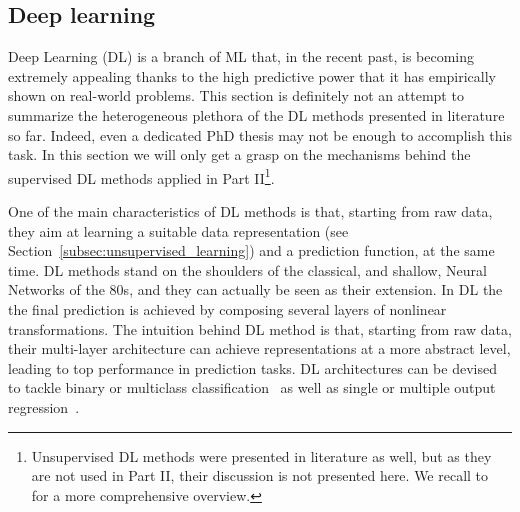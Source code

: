 
	    \subsection{Deep learning} \label{sec:deep_learning}
	    
		Deep Learning (DL) is a branch of ML that, in the recent past, is becoming extremely appealing thanks to the high predictive power that it has empirically shown on real-world problems.
		This section is definitely not an attempt to summarize the heterogeneous plethora of the DL methods presented in literature so far. Indeed, even a dedicated PhD thesis may not be enough to accomplish this task.
		In this section we will only get a grasp on the mechanisms behind the supervised DL methods applied in Part II\footnote{ Unsupervised DL methods were presented in literature as well, but as they are not used in Part II, their discussion is not presented here. We recall to~\cite{chollet2018deep, lecun2015deep} for a more comprehensive overview.}.
	    
	    One of the main characteristics of DL methods is that, starting from raw data, they aim at learning a suitable data representation (see Section~\ref{subsec:unsupervised_learning}) and a prediction function, at the same time.
	    DL methods stand on the shoulders of the classical, and shallow, Neural Networks of the $80$s, and they can actually be seen as their extension.
	    In DL the the final prediction is achieved by composing several layers of nonlinear transformations.
	    The intuition behind DL method is that, starting from raw data, their multi-layer architecture can achieve representations at a more abstract level, leading to top performance in prediction tasks.
	    DL architectures can be devised to tackle binary or multiclass classification~\cite{angermueller2016deep, leung2014deep} as well as single or multiple output regression~\cite{Chen2016GeneEI, ma2015deep}.

